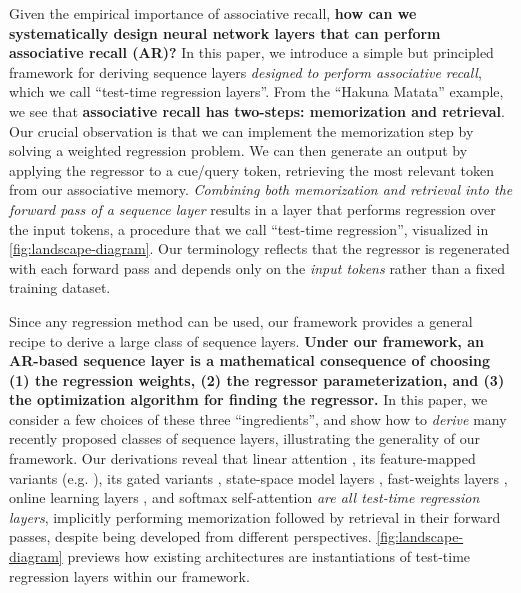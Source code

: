 \documentclass[notitlepage, 11pt]{article}
\begin{document}
Given the empirical importance of associative recall, \textbf{how can we systematically design neural network layers that can perform associative recall (AR)?}
In this paper, we introduce a simple but principled framework for deriving sequence layers \emph{designed to perform associative recall}, which we call ``test-time regression layers''.
From the ``Hakuna Matata'' example, we see that \textbf{associative recall has two-steps: memorization and retrieval}.
Our crucial observation is that we can implement the memorization step by solving a weighted regression problem.
We can then generate an output by applying the regressor to a cue/query token, retrieving the most relevant token from our associative memory.
\emph{Combining both memorization and retrieval into the forward pass of a sequence layer} results in a layer that performs regression over the input tokens, a procedure that we call ``test-time regression'', visualized in \autoref{fig:landscape-diagram}.
Our terminology reflects that the regressor is regenerated with each forward pass and depends only on the \emph{input tokens} rather than a fixed training dataset.

Since any regression method can be used, our framework provides a general recipe to derive a large class of sequence layers.
\textbf{Under our framework, an AR-based sequence layer is a mathematical consequence of choosing (1) the regression weights, (2) the regressor parameterization, and (3) the optimization algorithm for finding the regressor.}
In this paper, we consider a few choices of these three ``ingredients'', and show how to \emph{derive} many recently proposed classes of sequence layers, illustrating the generality of our framework.
Our derivations reveal that linear attention \citep{Katharopoulos2020TransformersAreRNNs}, its feature-mapped variants (e.g. \citep{Peng2020RandomFeatureAttention,Qin2021CosFormerRethinkingSoftmax,Kasai2021FinetuningPretrainedTransformers,Zhang2023HedgehogPorcupineExpressive,Aksenov2024LinearTransformersLearnable,Chen2024DiJiangEfficientLarge}), its gated variants \citep{Sun2023RetentiveNetworkSuccessor,Orvieto2023ResurrectingRecurrentNeural,Katsch2024GateLoopFullyDataControlled,De2024GriffinMixingGated,Qin2024HGRN2GatedLinear,Peng2024EagleFinchRWKV,Yang2024GatedLinearAttention,Beck2024XLSTMExtendedLong}, state-space model layers \citep{Gu2024MambaLinearTimeSequence,Dao2024TransformersAreSSMs}, fast-weights layers \citep{Schlag2021LinearTransformersAre,Yang2024GatedDeltaNetworks,Yang2024GatedDeltaNetworks}, online learning layers \citep{Liu2024LonghornStateSpace,Sun2024LearningLearnTest,Yang2024GatedDeltaNetworks,Behrouz2024TitansLearningMemorize}, and softmax self-attention \citep{Vaswani2017AttentionAllYou} \emph{are all test-time regression layers}, implicitly performing memorization followed by retrieval in their forward passes, despite being developed from different perspectives.
\autoref{fig:landscape-diagram} previews how existing architectures are instantiations of test-time regression layers within our framework.
\end{document}
